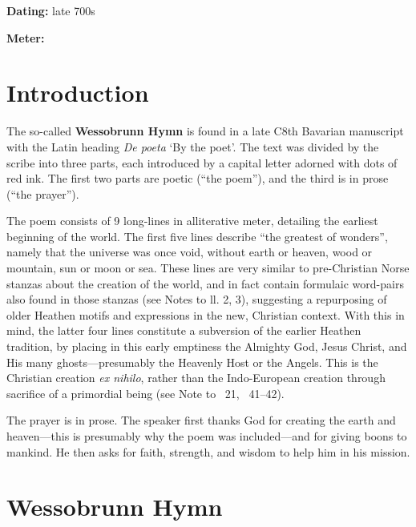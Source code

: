 
\begin{flushright}%
\textbf{Dating:} late 700s

\textbf{Meter:} \Fornyrdislag%
\end{flushright}%

\section{Introduction}

The so-called \textbf{Wessobrunn Hymn} is found in a late C8th Bavarian manuscript with the Latin heading \emph{De poeta} ‘By the poet’.  The text was divided by the scribe into three parts, each introduced by a capital letter adorned with dots of red ink.  The first two parts are poetic (“the poem”), and the third is in prose (“the prayer”).

The poem consists of 9 long-lines in alliterative meter, detailing the earliest beginning of the world.  The first five lines describe “the greatest of wonders”, namely that the universe was once void, without earth or heaven, wood or mountain, sun or moon or sea.  These lines are very similar to pre-Christian Norse stanzas about the creation of the world, and in fact contain formulaic word-pairs also found in those stanzas (see Notes to ll. 2, 3), suggesting a repurposing of older Heathen motifs and expressions in the new, Christian context.  With this in mind, the latter four lines constitute a subversion of the earlier Heathen tradition, by placing in this early emptiness the Almighty God, Jesus Christ, and His many ghosts—presumably the Heavenly Host or the Angels.  This is the Christian creation \emph{ex nihilo}, rather than the Indo-European creation through sacrifice of a primordial being (see Note to \Vafthrudnismal\ 21, \Grimnismal\ 41–42).

The prayer is in prose.  The speaker first thanks God for creating the earth and heaven—this is presumably why the poem was included—and for giving boons to mankind.  He then asks for faith, strength, and wisdom to help him in his mission.

\sectionline

\section{Wessobrunn Hymn}

